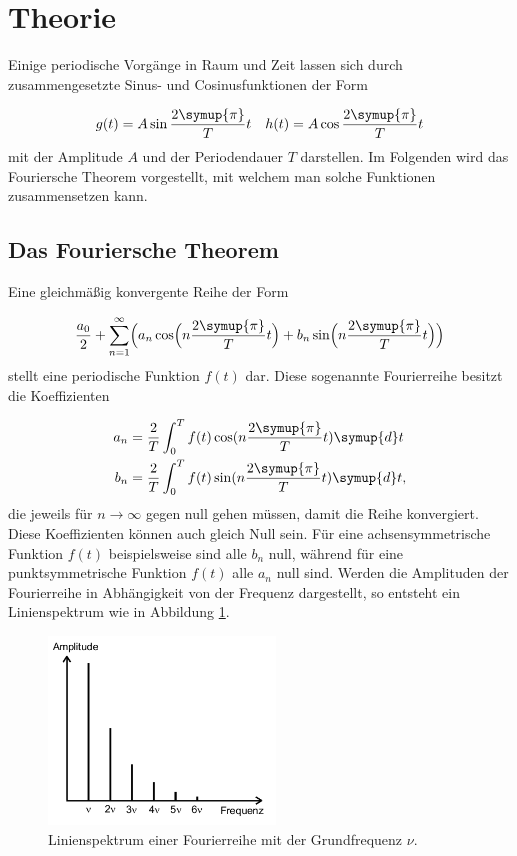 \section{Theorie}
\label{sec:Theorie}

Einige periodische Vorgänge in Raum und Zeit lassen sich durch
zusammengesetzte Sinus- und Cosinusfunktionen der Form

\begin{align}
  g(t) & = A\sin \frac{2\symup{\pi}}{T}t & h(t) & =
  A\cos \frac{2\symup{\pi}}{T}t \\
\end{align}
mit der Amplitude $A$ und der Periodendauer $T$ darstellen. Im Folgenden
wird das Fouriersche Theorem vorgestellt, mit welchem man solche Funktionen
zusammensetzen kann.

\subsection{Das Fouriersche Theorem}

Eine gleichmäßig konvergente Reihe der Form

\begin{equation}
  \frac{a_0}{2} + \sum_{n=1}^{\infty} \Bigl(a_n \cos
  \Bigl(n\frac{2\symup{\pi}}{T}t\Bigr)
  + b_n \sin \Bigl(n\frac{2\symup{\pi}}{T}t\Bigr)\Bigr)
\end{equation}
stellt eine periodische Funktion $f(t)$ dar.
Diese sogenannte Fourierreihe besitzt die Koeffizienten

\begin{align}
  a_n & = \frac{2}{T}
  \int_{0}^{T} f(t) \cos (n\frac{2\symup{\pi}}{T}t) \symup{d}t
  \\
  b_n & = \frac{2}{T}
  \int_{0}^{T} f(t) \sin (n\frac{2\symup{\pi}}{T}t) \symup{d}t,
  \label{eqn:anbn}
\end{align}
die jeweils für $n \to \infty$ gegen null gehen müssen, damit die Reihe
konvergiert. Diese Koeffizienten können auch gleich Null sein.
Für eine achsensymmetrische Funktion $f(t)$ beispielsweise sind alle $b_n$ null,
während für eine punktsymmetrische Funktion $f(t)$ alle $a_n$ null sind.
Werden die Amplituden der Fourierreihe in Abhängigkeit von der Frequenz
dargestellt,
so entsteht ein Linienspektrum wie in Abbildung \ref{fig:Linienspektrum}.

\newpage

\begin{figure}
  \centering
  \includegraphics[height = 5cm]{Linienspektrum.png}
  \caption{Linienspektrum einer Fourierreihe mit der Grundfrequenz $\nu$\cite{anleitung}.}
  \label{fig:Linienspektrum}
\end{figure}


